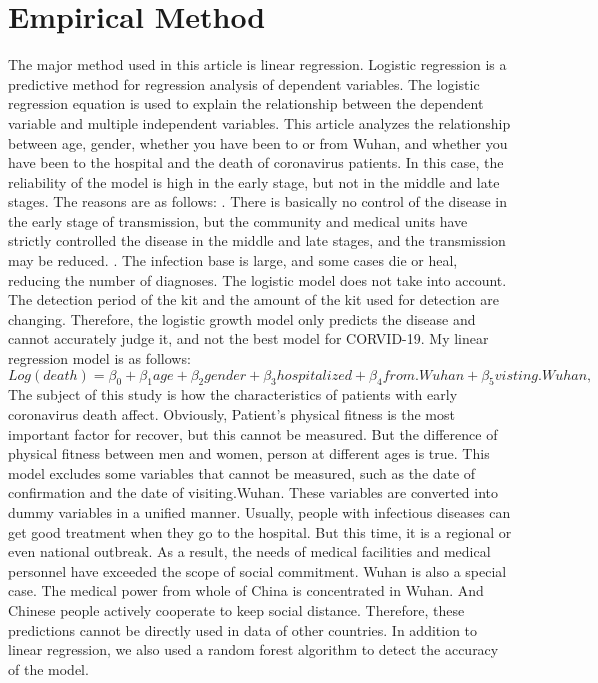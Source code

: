 \documentclass[12pt,english]{article}
\begin{document}
\section{Empirical Method}
The major method used in this article is linear regression. Logistic regression is a predictive method for regression analysis of dependent variables. The logistic regression equation is used to explain the relationship between the dependent variable and multiple independent variables. This article analyzes the relationship between age, gender, whether you have been to or from Wuhan, and whether you have been to the hospital and the death of coronavirus patients.
In this case, the reliability of the model is high in the early stage, but not in the middle and late stages. The reasons are as follows:
. There is basically no control of the disease in the early stage of transmission, but the community and medical units have strictly controlled the disease in the middle and late stages, and the transmission may be reduced.
. The infection base is large, and some cases die or heal, reducing the number of diagnoses. The logistic model does not take into account.
 The detection period of the kit and the amount of the kit used for detection are changing.
\cite{liu2020analysis}
\newline
Therefore, the logistic growth model only predicts the disease and cannot accurately judge it, and not the best model for CORVID-19.
My linear regression model is as follows:
\begin{equation}
\label{eq:1}
Log(death) =\beta_0 + \beta_1 age+ \beta_2 gender + \beta_3 hospitalized+\beta_4 from.Wuhan+ \beta_5 visting.Wuhan,
\end{equation}
The subject of this study is how the characteristics of patients with early coronavirus death affect. Obviously, Patient's physical fitness is the most important factor for recover, but this cannot be measured. But the difference of physical fitness between men and women, person at different ages is true. This model excludes some variables that cannot be measured, such as the date of confirmation and the date of visiting.Wuhan. These variables are converted into dummy variables in a unified manner. Usually, people with infectious diseases can get good treatment when they go to the hospital. But this time, it is a regional or even national outbreak. As a result, the needs of medical facilities and medical personnel have exceeded the scope of social commitment. Wuhan is also a special case. The medical power from whole of China is concentrated in Wuhan. And Chinese people actively cooperate to keep social distance. Therefore, these predictions cannot be directly used in data of other countries.
\newline
In addition to linear regression, we also used a random forest algorithm to detect the accuracy of the model.
\end{document}
